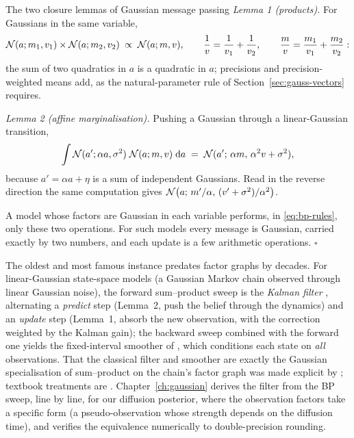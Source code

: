 \begin{toolbox}[tb:closure]{The two closure lemmas of Gaussian message passing}
\emph{Lemma 1 (products).} For Gaussians in the same variable,
\begin{equation*}
  \mathcal{N}(a; m_1, v_1) \times \mathcal{N}(a; m_2, v_2)
  \;\propto\; \mathcal{N}(a; m, v),
  \qquad
  \frac{1}{v} = \frac{1}{v_1} + \frac{1}{v_2},
  \qquad
  \frac{m}{v} = \frac{m_1}{v_1} + \frac{m_2}{v_2} :
\end{equation*}
the sum of two quadratics in $a$ is a quadratic in $a$; precisions and
precision-weighted means add, as the natural-parameter rule of
Section~\ref{sec:gauss-vectors} requires.

\emph{Lemma 2 (affine marginalisation).} Pushing a Gaussian through a
linear-Gaussian transition,
\begin{equation*}
  \int \mathcal{N}(a'; \alpha a, \sigma^2)\; \mathcal{N}(a; m, v)\; \mathrm{d} a
  \;=\; \mathcal{N}(a';\, \alpha m,\, \alpha^2 v + \sigma^2),
\end{equation*}
because $a' = \alpha a + \eta$ is a sum of independent Gaussians. Read in
the reverse direction the same computation gives
$\mathcal{N}\big(a;\, m'/\alpha,\, (v' + \sigma^2)/\alpha^2\big)$.

A model whose factors are Gaussian in each variable performs, in
\eqref{eq:bp-rules}, only these two operations. For such models every
message is Gaussian, carried exactly by two numbers, and each update is
a few arithmetic operations. \hfill$\square$
\end{toolbox}

The oldest and most famous instance predates factor graphs by decades.
For linear-Gaussian state-space models (a Gaussian Markov chain observed
through linear Gaussian noise), the forward sum--product sweep is the
\emph{Kalman filter} \citep{kalman1960new}, alternating a
\emph{predict} step (Lemma~2, push the belief through the dynamics) and
an \emph{update} step (Lemma~1, absorb the new observation, with the
correction weighted by the Kalman gain); the backward sweep combined with
the forward one yields the fixed-interval smoother of
\citet{rauch1965maximum}, which conditions each state on \emph{all}
observations. That the classical filter and smoother are exactly the
Gaussian specialisation of sum--product on the chain's factor graph was
made explicit by \citet{kschischang2001factor}; textbook treatments are
\citet{bishop2006pattern, koller2009probabilistic}.
Chapter~\ref{ch:gaussian} derives the filter from the BP sweep, line by
line, for our diffusion posterior, where the observation factors take a
specific form (a pseudo-observation whose strength depends on the
diffusion time), and verifies the equivalence numerically to
double-precision rounding.

